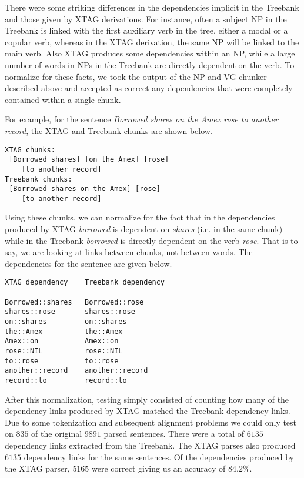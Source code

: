 There were some striking differences in the dependencies implicit in
the Treebank and those given by XTAG derivations. For instance, often
a subject NP in the Treebank is linked with the first auxiliary verb
in the tree, either a modal or a copular verb, whereas in the XTAG
derivation, the same NP will be linked to the main verb. Also XTAG
produces some dependencies within an NP, while a large number of words
in NPs in the Treebank are directly dependent on the verb. To
normalize for these facts, we took the output of the NP and VG chunker
described above and accepted as correct any dependencies that were
completely contained within a single chunk.

For example, for the sentence {\em Borrowed shares on the Amex rose to
another record}, the XTAG and Treebank chunks are shown below.

\begin{verbatim}
XTAG chunks:     
 [Borrowed shares] [on the Amex] [rose] 
    [to another record] 
Treebank chunks: 
 [Borrowed shares on the Amex] [rose] 
    [to another record] 
\end{verbatim}

Using these chunks, we can normalize for the fact that in the
dependencies produced by XTAG {\em borrowed} is dependent on {\em
shares} (i.e. in the same chunk) while in the Treebank {\em borrowed}
is directly dependent on the verb {\em rose}. That is to say, we are
looking at links between \underline{chunks}, not between
\underline{words}. The dependencies for the sentence are given below.

\begin{verbatim}
XTAG dependency    Treebank dependency

Borrowed::shares   Borrowed::rose 
shares::rose       shares::rose 
on::shares         on::shares 
the::Amex          the::Amex 
Amex::on           Amex::on 
rose::NIL          rose::NIL
to::rose           to::rose 
another::record    another::record 
record::to         record::to 
\end{verbatim}

After this normalization, testing simply consisted of counting how
many of the dependency links produced by XTAG matched the Treebank
dependency links. Due to some tokenization and subsequent alignment
problems we could only test on $835$ of the original $9891$ parsed
sentences. There were a total of $6135$ dependency links extracted
from the Treebank. The XTAG parses also produced $6135$ dependency
links for the same sentences. Of the dependencies produced by the XTAG
parser, $5165$ were correct giving us an accuracy of $84.2\%$.

